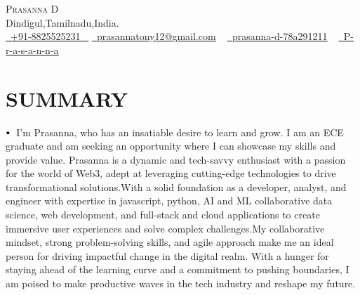 \documentclass[letterpaper,11pt]{article}
\newcommand\sbullet[1][.5]{\mathbin{\vcenter{\hbox{\scalebox{#1}{$\bullet$}}}}}
\begin{document}


\begin{center}
    {\Huge \scshape Prasanna D} \\ \vspace{1pt}
    Dindigul,Tamilnadu,India. \\ \vspace{1pt}
    \small \href{tel:+918825525231}{ \raisebox{-0.1\height}\faPhone\ \underline{+91-8825525231} ~} \href{mailto:prasannatony12@gmail.com}{\raisebox{-0.2\height}\faEnvelope\  \underline{prasannatony12@gmail.com}} ~ 
    \href{https://linkedin.com/in/prasanna-d-78a291211}{\raisebox{-0.2\height}\faLinkedinSquare\ \underline{prasanna-d-78a291211}}  ~
    \href{https://github.com/P-r-a-s-a-n-n-a}{\raisebox{-0.2\height}\faGithub\ \underline{P-r-a-s-a-n-n-a}} ~
\end{center}

\section{SUMMARY}
 \vspace{2pt}
$\sbullet[.75] \hspace{0.1cm}$ {I'm Prasanna, who has an insatiable\vspace{2pt} desire to learn and grow. I am an ECE graduate and am seeking an 
\vspace{2pt} opportunity where I can showcase my skills and provide value. Prasanna is a dynamic and tech-savvy enthusiast with a passion for the world of Web3, adept at leveraging cutting-edge technologies \vspace{2pt} to drive \vspace{2pt} transformational solutions.With a solid foundation as a developer, analyst, and engineer with expertise in javascript, python, AI \vspace{3pt} and \vspace{2pt}  ML collaborative data science, web development, and full-stack and cloud applications to create immersive \vspace{2pt} user experiences and solve complex challenges.My collaborative mindset, strong problem-solving skills, and  \vspace{2pt} agile \vspace{2pt} approach make me an ideal person \vspace{2pt} for driving impactful change in the digital realm. With a hunger for staying ahead of the learning curve and \vspace{2pt} a \vspace{2pt} commitment to pushing boundaries, I am poised to make productive waves in the tech industry and reshape \vspace{2pt} my future.}
\end{document}
